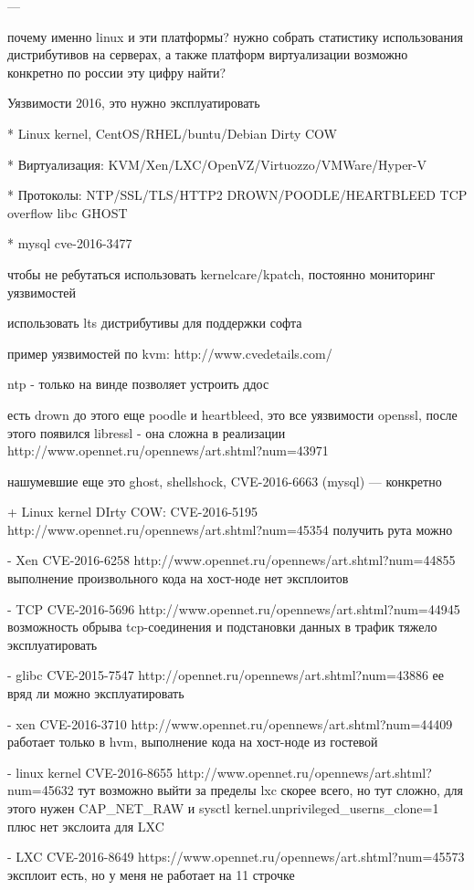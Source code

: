 ---


почему именно linux и эти платформы?
нужно собрать статистику использования дистрибутивов на серверах, а также платформ виртуализации
возможно конкретно по россии эту цифру найти?

Уязвимости 2016, это нужно эксплуатировать

* Linux kernel, CentOS/RHEL/buntu/Debian Dirty COW

* Виртуализация: KVM/Xen/LXC/OpenVZ/Virtuozzo/VMWare/Hyper-V

* Протоколы: NTP/SSL/TLS/HTTP2 DROWN/POODLE/HEARTBLEED TCP overflow libc GHOST

* mysql cve-2016-3477

чтобы не ребутаться использовать kernelcare/kpatch, постоянно мониторинг уязвимостей

использовать lts дистрибутивы для поддержки софта

пример уязвимостей по kvm: http://www.cvedetails.com/

ntp - только на винде позволяет устроить ддос

есть drown до этого еще poodle и heartbleed, это все уязвимости openssl, после этого появился libressl - она сложна в реализации http://www.opennet.ru/opennews/art.shtml?num=43971

нашумевшие еще это ghost, shellshock, CVE-2016-6663 (mysql)
--- конкретно

+ Linux kernel DIrty COW: CVE-2016-5195 http://www.opennet.ru/opennews/art.shtml?num=45354
получить рута можно

- Xen CVE-2016-6258 http://www.opennet.ru/opennews/art.shtml?num=44855
выполнение произвольного кода на хост-ноде
нет эксплоитов

- TCP CVE-2016-5696 http://www.opennet.ru/opennews/art.shtml?num=44945
возможность обрыва tcp-соединения и подстановки данных в трафик
тяжело эксплуатировать

- glibc CVE-2015-7547 http://opennet.ru/opennews/art.shtml?num=43886
ее вряд ли можно эксплуатировать

- xen CVE-2016-3710 http://www.opennet.ru/opennews/art.shtml?num=44409
работает только в hvm, выполнение кода на хост-ноде из гостевой

- linux kernel CVE-2016-8655 http://www.opennet.ru/opennews/art.shtml?num=45632
тут возможно выйти за пределы lxc скорее всего, но тут сложно, для этого нужен CAP\_NET\_RAW и sysctl kernel.unprivileged\_userns\_clone=1 плюс нет экслоита для LXC

- LXC CVE-2016-8649 https://www.opennet.ru/opennews/art.shtml?num=45573
эксплоит есть, но у меня не работает на 11 строчке


